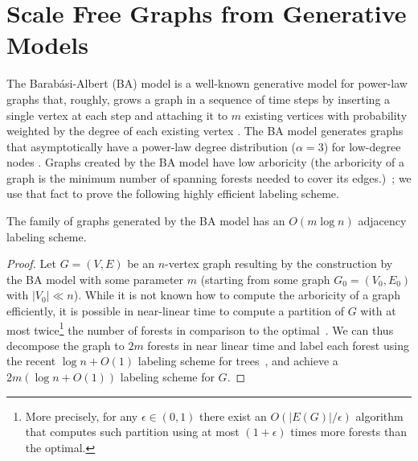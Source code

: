 \section{Scale Free  Graphs from Generative Models}\label{Sec:ScaleFree}
The Barab{\'a}si-Albert (BA) model is a well-known generative model for power-law graphs that, roughly, grows a graph in a sequence of time steps by
inserting a single vertex at each step and attaching it to $m$ existing vertices with probability weighted by the degree of each existing vertex \cite{barabasi1999emergence}. The BA model
generates graphs that asymptotically have a power-law degree distribution ($\alpha = 3$) for low-degree nodes \cite{DBLP:journals/rsa/BollobasRST01}.
Graphs created by the BA model have low arboricity (the arboricity of a graph is the minimum number of spanning forests needed to cover its edges.)~\cite{goel2006bounded}; we use
that fact to prove the following highly efficient labeling scheme. 



\begin{proposition}\label{Th:baLabeling}
The family of graphs generated by the BA model has an $O(m \log n)$ adjacency labeling scheme.
\end{proposition}

\begin{proof}
Let  $G=(V,E)$  be an $n$-vertex graph resulting by the construction  by the BA model with some parameter $m$ (starting from some graph $G_0 = (V_0,E_0)$ with $\vert V_0 \vert \ll n$).
While it is not known how to compute the   arboricity of a graph efficiently, it is possible in near-linear time to compute a partition of $G$ with  at most twice\footnote{More precisely, for any $\epsilon \in (0,1)$  there exist an $O(|E(G)| / \epsilon)$ algorithm~\cite{kowalik2006approximation} that computes such partition using at most $(1+ \epsilon)$ times more forests than the optimal.} the number of forests in comparison to the optimal~\cite{arikati1997efficient}.
We can thus decompose the graph to $2m$ forests in near linear time and label each forest using the recent $\log n + O(1)$ labeling scheme for trees~\cite{alstrup2015optimal},  and achieve a $2m (\log n+O(1))$ labeling scheme for $G$.
\end{proof}

